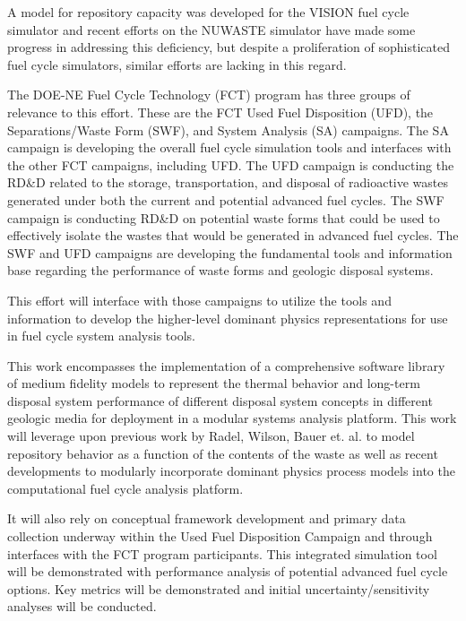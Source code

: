 A model for repository capacity was developed for the VISION 
fuel cycle simulator \cite{yacout_visionverifiable_2006}
\cite{radel_repository_2007} and recent efforts on the NUWASTE simulator 
\cite{ abkowitz_nuclear_2010} have made some progress in addressing this 
deficiency, but despite a proliferation of sophisticated fuel cycle simulators, 
similar efforts are lacking in this regard. 

The DOE-NE Fuel Cycle Technology (FCT) program has three groups of 
relevance to this effort.  These are the FCT Used Fuel Disposition 
(UFD), the Separations/Waste Form (SWF), and System Analysis (SA) 
campaigns.  The SA campaign is developing the overall fuel cycle 
simulation tools and interfaces with the other FCT campaigns, 
including UFD.  The UFD campaign is conducting the RD\&D related to 
the storage, transportation, and disposal of radioactive wastes 
generated under both the current and potential advanced fuel cycles.  
The SWF campaign is conducting RD\&D on potential waste forms that 
could be used to effectively isolate the wastes that would be 
generated in advanced fuel cycles.  The SWF and UFD campaigns are 
developing the fundamental tools and information base regarding the 
performance of waste forms and geologic disposal systems. 

This effort will interface with those campaigns to utilize the tools and 
information to develop the higher-level dominant physics 
representations for use in fuel cycle system analysis tools. 

This work encompasses the implementation of a comprehensive 
software library of medium fidelity models to represent the thermal 
behavior and long-term disposal system performance of different 
disposal system concepts in different geologic media for deployment in 
a modular systems analysis platform.  This work will leverage upon 
previous work by Radel, Wilson, Bauer et. al. to model repository 
behavior as a function of the contents of the waste as well as recent 
developments to modularly incorporate dominant physics 
process models into the \Cyclus computational fuel cycle analysis platform.

It will also rely on conceptual framework development and primary data 
collection underway within the Used Fuel Disposition Campaign and 
through interfaces with the FCT program participants.  This 
integrated simulation tool will be demonstrated with performance 
analysis of potential advanced fuel cycle options.  Key metrics will 
be demonstrated and initial uncertainty/sensitivity analyses will be 
conducted.

